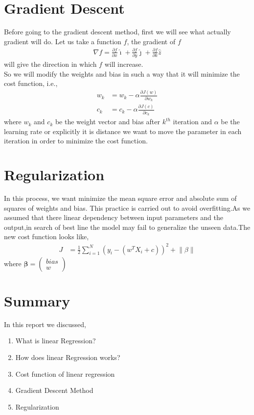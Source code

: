 \documentclass[journal,12pt,onecolumn]{IEEEtran}
\providecommand{\brak}[1]{\ensuremath{\left(#1\right)}}
\theoremstyle{remark}
\providecommand{\norm}[1]{\left\lVert#1\right\rVert}
\newcommand{\myvec}[1]{\ensuremath{\begin{pmatrix}#1\end{pmatrix}}}
\numberwithin{equation}{section}
\let\vec\mathbf
\begin{document}
  \section{Gradient Descent}
   Before going to the gradient descent method, first we will see what actually gradient will do. Let us take a function $f$, the gradient of $f$
                 \begin{align}
			 \nabla f =\frac{\partial f}{\partial x}\hat{\imath} + \frac{\partial f}{\partial y}\hat{\jmath} +\frac{\partial f}{\partial k}\hat{z}
	         \end{align}
		 will give the direction in which $f$ will increase.\\
      So we will modify the weights and bias in such a way that it will minimize the cost function, i.e.,
       \begin{align}
	       w_{k} &= w_{k} -\alpha \frac{\partial J\brak{w}}{\partial w_{k}} \\
	       c_{k} &= c_{k} -\alpha \frac{\partial J\brak{c}}{\partial c_{k}}
       \end{align}
        where $w_{k}$ and $c_{k}$ be the weight vector and bias after $k^{th}$ iteration and $\alpha$ be the learning rate or explicitly it is distance we want to move the parameter in each iteration in order to minimize the cost function. 
  \section{Regularization}
    In this process, we want minimize the mean square error and absolute sum of squares of weights and bias. This practice is carried out to avoid overfitting.As we assumed that there linear dependency between input parameters and the output,in search of best line the model may fail to generalize the unseen data.The new cost function looks like,
           \begin{align}
		   J&= \frac{1}{2}\sum_{i=1}^{N}\brak{y_{i}-\brak{w^TX_{i}+c}}^{2} + \norm{\beta}
           \end{align}
	   where $\vec{\beta} = \myvec{bias \\ w}$
  \section{Summary}
  In this report we discussed,
    \begin{enumerate}
     \item What is linear Regression?
     \item How does linear Regression works? 
     \item Cost function of linear regression	     
     \item Gradient Descent Method
     \item Regularization
     \end{enumerate}
\end{document}
